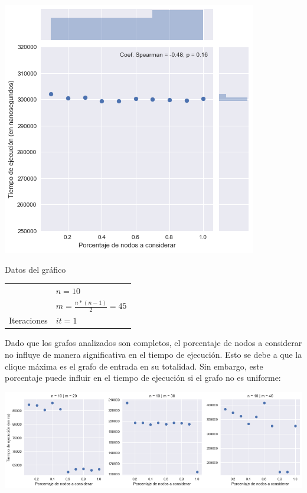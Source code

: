 \noindent
\begin{minipage}{0.55\textwidth}
    \hfill
    \includegraphics[scale=0.6]{img/grasp-p.png}
\end{minipage}
\hfill
\begin{minipage}{0.44\textwidth}
    \begin{center}
        Datos del gráfico

        \begin{tabular}{ | l l |}
            \hline
             & $n = 10$ \\ 
             & $m =  \frac{n * (n-1)}{2} = 45$ \\ 
            Iteraciones & $it = 1$ \\
            \hline
        \end{tabular}
    \end{center}
\end{minipage}

Dado que los grafos analizados son completos, el porcentaje de nodos a considerar no influye de manera significativa en el tiempo de ejecución. Esto se debe a que la clique máxima es el grafo de entrada en su totalidad. Sin embargo, este porcentaje puede influir en el tiempo de ejecución si el grafo no es uniforme:

\begin{center}
    \includegraphics[scale=0.6]{img/grasp-p-multi.png}
\end{center}

